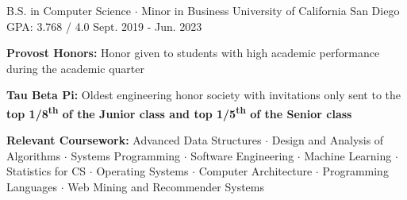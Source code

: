 

\begin{cventries}

  \cventry
    {B.S. in Computer Science $\cdot$ Minor in Business} %
    {University of California San Diego} %
    {GPA: 3.768 / 4.0} %
    {Sept. 2019 - Jun. 2023} %
    {
      \begin{cvitems} %
        \item {\textbf{Provost Honors:} Honor given to students with high academic performance during the academic quarter}
        \item {\textbf{Tau Beta Pi:} Oldest engineering honor society with invitations only sent to the \textbf{top 1/8\textsuperscript{th} of the Junior class and top 1/5\textsuperscript{th} of the Senior class}}
        \item {\textbf{Relevant Coursework:} Advanced Data Structures $\cdot$ Design and Analysis of Algorithms $\cdot$ Systems Programming $\cdot$ Software Engineering $\cdot$ Machine Learning $\cdot$ Statistics for CS $\cdot$ Operating Systems $\cdot$ Computer Architecture $\cdot$ Programming Languages $\cdot$ Web Mining and Recommender Systems}
      \end{cvitems}
    }

\end{cventries}
